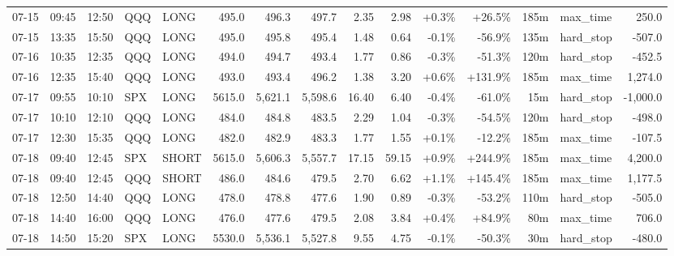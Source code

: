 \documentclass[11pt,a4paper,twoside]{article}
\begin{document}
\begin{landscape}
\begin{center}
\begin{longtable}{>{\color{txtmain}}l l l l l r r r r r r r r >{\color{txtmain}}l r}
07-15 & 09:45 & 12:50 & QQQ & LONG & 495.0 & 496.3 & 497.7 & 2.35 & 2.98 & \textcolor{wingreen}{+0.3\%} & \textcolor{wingreen}{+26.5\%} & 185m & max\_time & \textcolor{wingreen}{250.0} \\
07-15 & 13:35 & 15:50 & QQQ & LONG & 495.0 & 495.8 & 495.4 & 1.48 & 0.64 & \textcolor{lossred}{-0.1\%} & \textcolor{lossred}{-56.9\%} & 135m & hard\_stop & \textcolor{lossred}{-507.0} \\
07-16 & 10:35 & 12:35 & QQQ & LONG & 494.0 & 494.7 & 493.4 & 1.77 & 0.86 & \textcolor{lossred}{-0.3\%} & \textcolor{lossred}{-51.3\%} & 120m & hard\_stop & \textcolor{lossred}{-452.5} \\
07-16 & 12:35 & 15:40 & QQQ & LONG & 493.0 & 493.4 & 496.2 & 1.38 & 3.20 & \textcolor{wingreen}{+0.6\%} & \textcolor{wingreen}{+131.9\%} & 185m & max\_time & \textcolor{wingreen}{1,274.0} \\
07-17 & 09:55 & 10:10 & SPX & LONG & 5615.0 & 5,621.1 & 5,598.6 & 16.40 & 6.40 & \textcolor{lossred}{-0.4\%} & \textcolor{lossred}{-61.0\%} & 15m & hard\_stop & \textcolor{lossred}{-1,000.0} \\
07-17 & 10:10 & 12:10 & QQQ & LONG & 484.0 & 484.8 & 483.5 & 2.29 & 1.04 & \textcolor{lossred}{-0.3\%} & \textcolor{lossred}{-54.5\%} & 120m & hard\_stop & \textcolor{lossred}{-498.0} \\
07-17 & 12:30 & 15:35 & QQQ & LONG & 482.0 & 482.9 & 483.3 & 1.77 & 1.55 & \textcolor{wingreen}{+0.1\%} & \textcolor{lossred}{-12.2\%} & 185m & max\_time & \textcolor{lossred}{-107.5} \\
07-18 & 09:40 & 12:45 & SPX & SHORT & 5615.0 & 5,606.3 & 5,557.7 & 17.15 & 59.15 & \textcolor{wingreen}{+0.9\%} & \textcolor{wingreen}{+244.9\%} & 185m & max\_time & \textcolor{wingreen}{4,200.0} \\
07-18 & 09:40 & 12:45 & QQQ & SHORT & 486.0 & 484.6 & 479.5 & 2.70 & 6.62 & \textcolor{wingreen}{+1.1\%} & \textcolor{wingreen}{+145.4\%} & 185m & max\_time & \textcolor{wingreen}{1,177.5} \\
07-18 & 12:50 & 14:40 & QQQ & LONG & 478.0 & 478.8 & 477.6 & 1.90 & 0.89 & \textcolor{lossred}{-0.3\%} & \textcolor{lossred}{-53.2\%} & 110m & hard\_stop & \textcolor{lossred}{-505.0} \\
07-18 & 14:40 & 16:00 & QQQ & LONG & 476.0 & 477.6 & 479.5 & 2.08 & 3.84 & \textcolor{wingreen}{+0.4\%} & \textcolor{wingreen}{+84.9\%} & 80m & max\_time & \textcolor{wingreen}{706.0} \\
07-18 & 14:50 & 15:20 & SPX & LONG & 5530.0 & 5,536.1 & 5,527.8 & 9.55 & 4.75 & \textcolor{lossred}{-0.1\%} & \textcolor{lossred}{-50.3\%} & 30m & hard\_stop & \textcolor{lossred}{-480.0} \\

\end{longtable}
\end{center}
\end{landscape}
\end{document}
